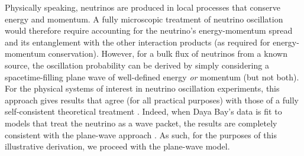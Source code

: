\documentclass[../thesis.tex]{subfiles}
\begin{document}
Physically speaking, neutrinos are produced in local processes that conserve energy and momentum. A fully microscopic treatment of neutrino oscillation would therefore require accounting for the neutrino's energy-momentum spread and its entanglement with the other interaction products (as required for energy-momentum conservation). However, for a bulk flux of neutrinos from a known source, the oscillation probability can be derived by simply considering a spacetime-filling plane wave of well-defined energy \emph{or} momentum (but not both). For the physical systems of interest in neutrino oscillation experiments, this approach gives results that agree (for all practical purposes) with those of a fully self-consistent theoretical treatment \cite{Ligeti}. Indeed, when Daya Bay's data is fit to models that treat the neutrino as a wave packet, the results are completely consistent with the plane-wave approach \cite{DayaBayWavePacket}. As such, for the purposes of this illustrative derivation, we proceed with the plane-wave model.
\end{document}
